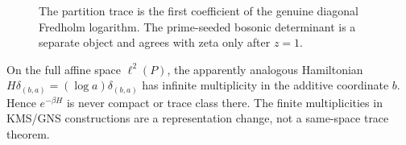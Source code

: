 \begin{figure}[t]
\centering

\caption{The partition trace is the first coefficient of the genuine
diagonal Fredholm logarithm.  The prime-seeded bosonic determinant is a
separate object and agrees with zeta only after $z=1$.}
\label{fig:trace-det}
\end{figure}

On the full affine space $\ell^2(P)$, the apparently analogous Hamiltonian
$H\delta_{(b,a)}=(\log a)\delta_{(b,a)}$ has infinite multiplicity in the
additive coordinate $b$.  Hence $e^{-\beta H}$ is never compact or trace
class there.  The finite multiplicities in KMS/GNS constructions are a
representation change, not a same-space trace theorem.
